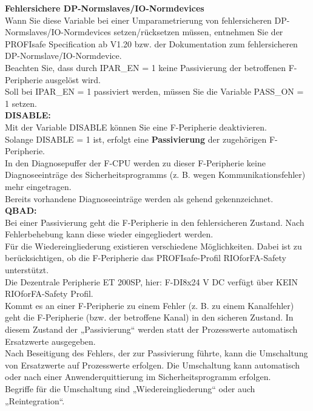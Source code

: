 \textbf{Fehlersichere DP-Normslaves/IO-Normdevices}\\
Wann Sie diese Variable bei einer Umparametrierung von fehlersicheren DP-Normslaves/IO-Normdevices setzen/rücksetzen müssen, entnehmen Sie der PROFIsafe Specification ab V1.20 bzw. der Dokumentation zum fehlersicheren DP-Normslave/IO-Normdevice.\\
Beachten Sie, dass durch IPAR\_EN = 1 keine Passivierung der betroffenen F-Peripherie ausgelöst wird.\\
Soll bei IPAR\_EN = 1 passiviert werden, müssen Sie die Variable PASS\_ON = 1 setzen.\\

\textbf{DISABLE:}\\
Mit der Variable DISABLE können Sie eine F-Peripherie deaktivieren.\\
Solange DISABLE = 1 ist, erfolgt eine \textbf{Passivierung} der zugehörigen F-Peripherie.\\
In den Diagnosepuffer der F-CPU werden zu dieser F-Peripherie keine Diagnoseeinträge des Sicherheitsprogramms (z. B. wegen Kommunikationsfehler) mehr eingetragen.\\
Bereits vorhandene Diagnoseeinträge werden als gehend gekennzeichnet.\\

\textbf{QBAD:}\\
Bei einer Passivierung geht die F-Peripherie in den fehlersicheren Zustand. Nach Fehlerbehebung kann diese wieder eingegliedert werden.\\
Für die Wiedereingliederung existieren verschiedene Möglichkeiten. Dabei ist zu berücksichtigen, ob die F-Peripherie das PROFIsafe-Profil RIOforFA-Safety unterstützt.\\
Die Dezentrale Peripherie ET 200SP, hier: F-DI8x24 V DC verfügt über KEIN RIOforFA-Safety Profil.\\
Kommt es an einer F-Peripherie zu einem Fehler (z. B. zu einem Kanalfehler) geht die F-Peripherie (bzw. der betroffene Kanal) in den sicheren Zustand. In diesem Zustand der „Passivierung“ werden statt der Prozesswerte automatisch Ersatzwerte ausgegeben.\\
Nach Beseitigung des Fehlers, der zur Passivierung führte, kann die Umschaltung von Ersatzwerte auf Prozesswerte erfolgen. Die Umschaltung kann automatisch oder nach einer Anwenderquittierung im Sicherheitsprogramm erfolgen.\\
Begriffe für die Umschaltung sind „Wiedereingliederung“ oder auch „Reintegration“.

